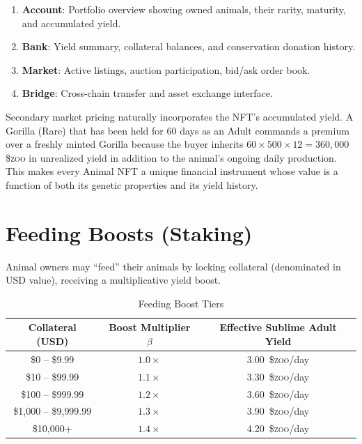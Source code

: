\documentclass[11pt,letterpaper]{article}
\newcommand{\ZOO}{\$\textsc{zoo}}
\begin{document}
\begin{enumerate}
    \item \textbf{Account}: Portfolio overview showing owned animals, their rarity, maturity,
          and accumulated yield.
    \item \textbf{Bank}: Yield summary, collateral balances, and conservation donation
          history.
    \item \textbf{Market}: Active listings, auction participation, bid/ask order book.
    \item \textbf{Bridge}: Cross-chain transfer and asset exchange interface.
\end{enumerate}

Secondary market pricing naturally incorporates the NFT's accumulated yield.  A Gorilla
(Rare) that has been held for 60 days as an Adult commands a premium over a freshly minted
Gorilla because the buyer inherits $60 \times 500 \times 12 = 360{,}000$ \ZOO{} in
unrealized yield in addition to the animal's ongoing daily production.  This makes
every Animal NFT a unique financial instrument whose value is a function of both its
genetic properties and its yield history.

\section{Feeding Boosts (Staking)}
\label{sec:feed}

Animal owners may ``feed'' their animals by locking collateral (denominated in USD value), receiving a multiplicative yield boost.

\begin{table}[ht]
\centering
\caption{Feeding Boost Tiers}
\label{tab:feeding}
\begin{tabular}{@{}ccc@{}}
\toprule
\textbf{Collateral (USD)} & \textbf{Boost Multiplier $\beta$} & \textbf{Effective Sublime Adult Yield} \\
\midrule
\$0 -- \$9.99 & $1.0\times$ & 3.00~\ZOO{}/day \\
\$10 -- \$99.99 & $1.1\times$ & 3.30~\ZOO{}/day \\
\$100 -- \$999.99 & $1.2\times$ & 3.60~\ZOO{}/day \\
\$1{,}000 -- \$9{,}999.99 & $1.3\times$ & 3.90~\ZOO{}/day \\
\$10{,}000+ & $1.4\times$ & 4.20~\ZOO{}/day \\
\bottomrule
\end{tabular}
\end{table}
\end{document}
